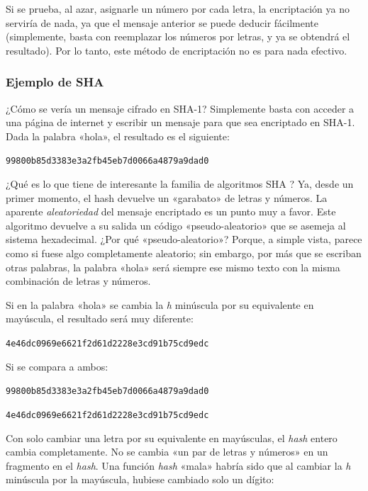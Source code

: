 \documentclass[12pt,a4paper,twoside]{book}
\begin{document}
Si se prueba, al azar, asignarle un número por cada letra, la encriptación ya no serviría de nada, ya que el mensaje anterior se puede deducir fácilmente (simplemente, basta con reemplazar los números por letras, y ya se obtendrá el resultado). Por lo tanto, este método de encriptación no es para nada efectivo.

\subsubsection{Ejemplo de SHA}
¿Cómo se vería un mensaje cifrado en SHA-1? Simplemente basta con acceder a una página de internet y escribir un mensaje para que sea encriptado en SHA-1. Dada la palabra «hola», el resultado es el siguiente:

\begin{center}
\texttt{99800b85d3383e3a2fb45eb7d0066a4879a9dad0}
\end{center}

¿Qué es lo que tiene de interesante la familia de algoritmos SHA ? Ya, desde un primer momento, el hash devuelve un «garabato» de letras y números. La aparente \textit{aleatoriedad} del mensaje encriptado es un punto muy a favor. Este algoritmo devuelve a su salida un código «pseudo-aleatorio» que se asemeja al sistema hexadecimal. ¿Por qué «pseudo-aleatorio»? Porque, a simple vista, parece como si fuese algo completamente aleatorio; sin embargo, por más que se escriban otras palabras, la palabra «hola» será siempre ese mismo texto con la misma combinación de letras y números.

Si en la palabra «hola» se cambia la \textit{h} minúscula por su equivalente en mayúscula, el resultado será muy diferente:

\begin{center}
\texttt{4e46dc0969e6621f2d61d2228e3cd91b75cd9edc}
\end{center}

Si se compara a ambos:

\begin{center}
\texttt{99800b85d3383e3a2fb45eb7d0066a4879a9dad0}

\texttt{4e46dc0969e6621f2d61d2228e3cd91b75cd9edc}
\end{center}

Con solo cambiar una letra por su equivalente en mayúsculas, el \textit{hash} entero cambia completamente. No se cambia «un par de letras y números» en un fragmento en el \textit{hash}. Una función \textit{hash} «mala» habría sido que al cambiar la \textit{h} minúscula por la mayúscula, hubiese cambiado solo un dígito:
\end{document}

